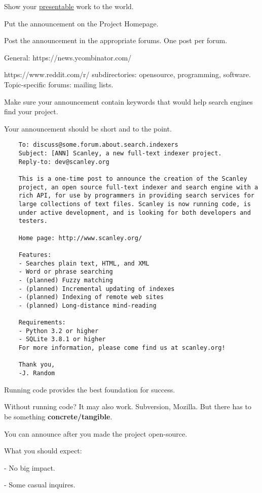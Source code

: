 \documentclass[landscape,30pt]{foils}
\begin{document}
Show your \underline{presentable} work to the world.

Put the announcement on the Project Homepage.

Post the announcement in the appropriate forums.   One post per forum.

General: https://news.ycombinator.com/

https://www.reddit.com/r/ subdirectories: opensource, programming, software.  Topic-specific forums: mailing lists. 

Make sure your announcement contain keywords that would help search engines find your project.

Your announcement should be short and to the point.

{\tiny
\begin{verbatim}
    To: discuss@some.forum.about.search.indexers
    Subject: [ANN] Scanley, a new full-text indexer project.
    Reply-to: dev@scanley.org

    This is a one-time post to announce the creation of the Scanley
    project, an open source full-text indexer and search engine with a
    rich API, for use by programmers in providing search services for
    large collections of text files. Scanley is now running code, is
    under active development, and is looking for both developers and
    testers.

    Home page: http://www.scanley.org/

    Features:
    - Searches plain text, HTML, and XML
    - Word or phrase searching
    - (planned) Fuzzy matching
    - (planned) Incremental updating of indexes
    - (planned) Indexing of remote web sites
    - (planned) Long-distance mind-reading

    Requirements:
    - Python 3.2 or higher
    - SQLite 3.8.1 or higher
    For more information, please come find us at scanley.org!

    Thank you,
    -J. Random
\end{verbatim}
}

Running code provides the best foundation for success.

Without running code?  It may also work.  Subversion, Mozilla.   But there has to be something {\bf concrete/tangible}.

You can announce after you made the project open-source.

What you should expect:

- No big impact.

- Some casual inquires.
\end{document}
